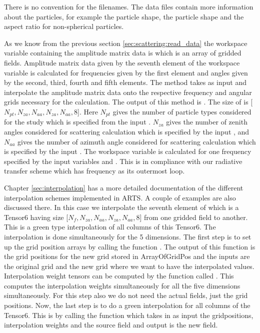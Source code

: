 There is no convention for the filenames. The data files contain more 
information about the particles, for example the particle shape, the
particle shape and the aspect ratio for non-spherical particles.



\label{sec:scattering:gen_ampmat}

As we know from the previous section \ref{sec:scattering:read_data} 
the workspace variable containing the amplitude matrix data is 
 which is an array of gridded
fields. Amplitude matrix data given by the seventh element of the
workspace variable  is calculated for
frequencies given by the first element  and angles given by the
second, third,  fourth and fifth elements.  The method
 takes  as input and
interpolate the amplitude matrix data onto the respective frequency
and angular grids necessary for the calculation.  The output of this
method is .  The size of  is  
[$N_{pt}, N_{za}, N_{aa}, N_{za}, N_{aa}, 8$]. Here $N_{pt}$ gives
the number of particle types considered for the study which is
specified from the input . $N_{za}$ gives
the number of zenith angles considered for scattering calculation 
which is specified by the input , and $N_{aa}$
gives the number of azimuth angle considered for scattering
calculation which is specified by the input .
The workspace variable  is calculated for one
frequency specified by the input variables  and
. This is in compliance with our radiative
transfer scheme which has frequency as its outermost loop. 

Chapter \ref{sec:interpolation} has a more
detailed documentation of the different interpolation schemes
implemented in ARTS. A couple of examples are also discussed there.
In this case we interpolate the seventh element of
 which is a Tensor6 having size
[$N_{f}, N_{za}, N_{aa}, N_{za}, N_{aa}, 8$] from one gridded field to
another.  This is a green type interpolation of all columns of this
Tensor6.  The interpolation is done simultaneously for the 5 dimensions.
The first step is to set up the grid position arrays by calling the
function .  The output of this function is the grid
positions for the new grid stored in ArrayOfGridPos and the inputs are
the original grid and the new grid where we want to have the
interpolated values. Interpolation weight tensors can be computed by
the function called .  This computes the
interpolation weights simultaneously for all the five dimensions
simultaneously. For this step also we do not need the actual fields,
just the grid positions. Now, the last step is to do a green
interpolation for all columns of the Tensor6.  This is by calling the
function  which takes in as input the
gridpositions, interpolation weights and the source field and output
is the new field.  

